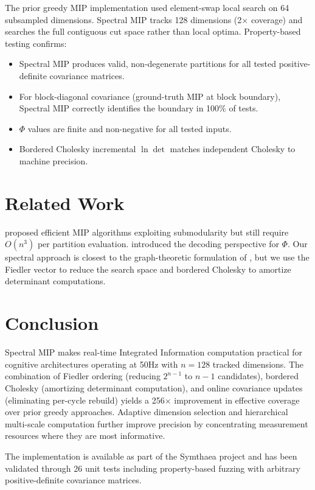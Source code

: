 \documentclass[10pt,letterpaper]{article}
\begin{document}
The prior greedy MIP implementation used element-swap local search on 64 subsampled dimensions. Spectral MIP tracks 128 dimensions (2$\times$ coverage) and searches the full contiguous cut space rather than local optima. Property-based testing confirms:

\begin{itemize}[nosep]
  \item Spectral MIP produces valid, non-degenerate partitions for all tested positive-definite covariance matrices.
  \item For block-diagonal covariance (ground-truth MIP at block boundary), Spectral MIP correctly identifies the boundary in 100\% of tests.
  \item $\Phi$ values are finite and non-negative for all tested inputs.
  \item Bordered Cholesky incremental $\ln \det$ matches independent Cholesky to machine precision.
\end{itemize}

\section{Related Work}

\citet{kitazono2018} proposed efficient MIP algorithms exploiting submodularity but still require $O(n^3)$ per partition evaluation. \citet{oizumi2016} introduced the decoding perspective for $\Phi$. Our spectral approach is closest to the graph-theoretic formulation of \citet{balduzzi2008}, but we use the Fiedler vector to reduce the search space and bordered Cholesky to amortize determinant computations.

\section{Conclusion}

Spectral MIP makes real-time Integrated Information computation practical for cognitive architectures operating at 50Hz with $n = 128$ tracked dimensions. The combination of Fiedler ordering (reducing $2^{n-1}$ to $n-1$ candidates), bordered Cholesky (amortizing determinant computation), and online covariance updates (eliminating per-cycle rebuild) yields a 256$\times$ improvement in effective coverage over prior greedy approaches. Adaptive dimension selection and hierarchical multi-scale computation further improve precision by concentrating measurement resources where they are most informative.

The implementation is available as part of the Symthaea project and has been validated through 26 unit tests including property-based fuzzing with arbitrary positive-definite covariance matrices.



\end{document}
